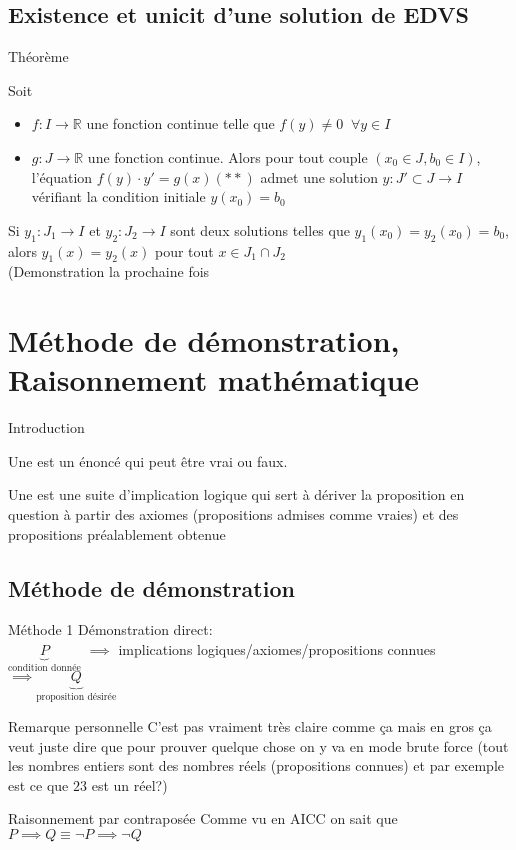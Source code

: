 \documentclass[11pt]{book}
\begin{document}
\section{Existence et unicit d'une solution de EDVS}
\begin{parag}{Théorème}
    \begin{theoreme}
        Soit \begin{itemize}
            \item $f: I \to \mathbb{R}$ une fonction continue telle que $f(y) \neq 0\;\; \forall y \in I$
            \item $g : J \to \mathbb{R}$ une fonction continue. Alors pour tout couple $(x_0 \in J, b_0 \in I)$, l'équation $f(y)\cdot y' = g(x) (**)$ admet une solution $y : J' \subset J \to I$ vérifiant la condition initiale $y(x_0) = b_0$
        \end{itemize}
        Si $y_1 : J_1 \to I$ et $y_2 : J_2 \to I$ sont deux solutions telles que $y_1(x_0) = y_2(x_0) = b_0$, alors $y_1(x) = y_2(x)$ pour tout $x \in J_1 \cap J_2$
        \\
        (Demonstration la prochaine fois
        
    \end{theoreme}
\end{parag}
\chapter{Méthode de démonstration, Raisonnement mathématique}
\begin{parag}{Introduction}
    \begin{definition}
        Une  est un énoncé qui peut être vrai ou faux.
    \end{definition}
    \begin{definition}
        Une  est une suite d'implication logique qui sert à dériver la proposition en question à partir des axiomes (propositions admises comme vraies) et des propositions préalablement obtenue
    \end{definition}
\end{parag}
\section{Méthode de démonstration}
\begin{parag}{Méthode 1}
    Démonstration direct:\\ $\underbrace{P}_{\text{condition donnée}}$ $\implies$ implications logiques/axiomes/propositions connues $\implies \underbrace{Q}_{\text{proposition désirée}}$
    \begin{subparag}{Remarque personnelle}
        C'est pas vraiment très claire comme ça mais en gros ça veut juste dire que pour prouver quelque chose on y va en mode brute force (tout les nombres entiers sont des nombres réels (propositions connues) et par exemple est ce que $23$ est un réel?) 
    \end{subparag}
\end{parag}
\begin{parag}{Raisonnement par contraposée}
    Comme vu en AICC on sait que $P \implies Q \equiv \neg P \implies \neg Q$
\end{parag}
\end{document}
